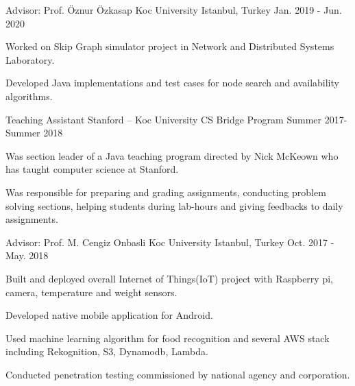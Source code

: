 
\begin{cventries}
  \cventry
    {Advisor: Prof. Öznur Özkasap} %
    {Koc University} %
    {Istanbul, Turkey} %
    {Jan. 2019 - Jun. 2020} %
    {
      \begin{cvitems} %
        \item {Worked on Skip Graph simulator project in Network and Distributed Systems Laboratory.}
        \item {Developed Java implementations and test cases for node search and availability algorithms.}
      \end{cvitems}
    }

  \cventry
    {Teaching Assistant } %
    {Stanford – Koc University CS Bridge Program} %
    {} %
    {Summer 2017-Summer 2018} %
    {
      \begin{cvitems} %
        \item {Was section leader of a Java teaching program directed by Nick McKeown who has taught computer science at Stanford.}
        \item {Was responsible for preparing and grading assignments, conducting problem solving sections, helping students during lab-hours and giving feedbacks to daily assignments.}
      \end{cvitems}
    }

  \cventry
    {Advisor: Prof. M. Cengiz Onbasli} %
    {Koc University} %
    {Istanbul, Turkey} %
    {Oct. 2017 - May. 2018} %
    {
      \begin{cvitems} %
        \item {Built and deployed overall Internet of Things(IoT) project with Raspberry pi, camera, temperature and weight sensors.  }
        \item {Developed native mobile application for Android. }
       	\item {Used machine learning algorithm for food recognition and several AWS stack including Rekognition, S3, Dynamodb, Lambda.} 
        \item {Conducted penetration testing commissioned by national agency and corporation.}
      \end{cvitems}
    }


\end{cventries}
